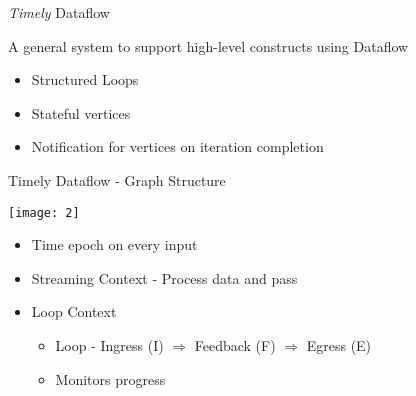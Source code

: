 \begin{frame}[t]{\emph{Timely} Dataflow}
  \vspace{0.15cm}
  \begin{center}
    A general system to support high-level constructs using Dataflow
  \end{center}

  \vspace{0.15cm}
  \begin{itemize}
    \item Structured Loops
    \item Stateful vertices
    \item Notification for vertices on iteration completion
  \end{itemize}


\end{frame}

\begin{frame}[t]{Timely Dataflow - Graph Structure}

  \begin{center}
    \texttt{[image: 2]}
  \end{center}

  \begin{itemize}
    \item Time epoch on every input
    \item Streaming Context - Process data and pass
    \item Loop Context
    \begin{itemize}
      \item Loop - Ingress (I) $\Rightarrow$ Feedback (F) $\Rightarrow$ Egress (E)
      \item Monitors progress
    \end{itemize}
  \end{itemize}

\end{frame}

